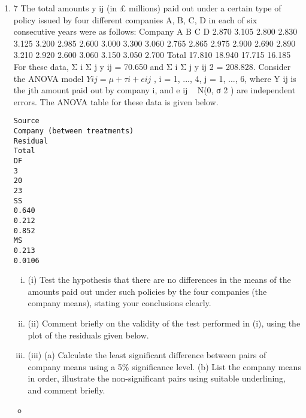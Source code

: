 \documentclass[a4paper,12pt]{article}
\begin{document}
\begin{enumerate}
\item
7
The total amounts y ij (in £ millions) paid out under a certain type of policy issued by four different companies A, B, C, D in each of six consecutive years were as follows:
Company
A
B
C
D
2.870
3.105
2.800
2.830
3.125
3.200
2.985
2.600
3.000
3.300
3.060
2.765
2.865
2.975
2.900
2.690
2.890
3.210
2.920
2.600
3.060
3.150
3.050
2.700
Total
17.810
18.940
17.715
16.185
For these data, Σ i Σ j y ij = 70.650 and Σ i Σ j y ij 2 = 208.828.
Consider the ANOVA model $Y ij = μ + τ i + e ij$ , i = 1, ..., 4, j = 1, ..., 6, where Y ij is the
jth amount paid out by company i, and e ij ~ N(0, σ 2 ) are independent errors.
The ANOVA table for these data is given below.

\begin{verbatim}
Source
Company (between treatments)
Residual
Total
DF
3
20
23
SS
0.640
0.212
0.852
MS
0.213
0.0106
\end{verbatim}

\begin{enumerate}[(i)]
\item (i) Test the hypothesis that there are no differences in the means of the amounts paid out under such policies by the four companies (the company means), stating your conclusions clearly.
\item 
(ii) Comment briefly on the validity of the test performed in (i), using the plot of the residuals given below.
\item
(iii) (a)
Calculate the least significant difference between pairs of company means using a 5\% significance level.
(b)
List the company means in order, illustrate the non-significant pairs using suitable underlining, and comment briefly.
\end{enumerate}
 \begin{itemize}
     \item 


\end{itemize}
\end{enumerate}
\end{document}
